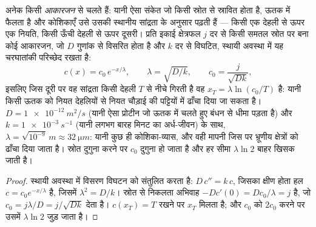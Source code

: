 \begin{theorem}\label{thm:b2:vertebrate-development:gradient}
अनेक  किसी \emph{आकारजन} से चलते हैं: यानी ऐसा संकेत जो किसी
स्रोत से स्रावित होता है, ऊतक में फैलता है और कोशिकाएँ उसे उसकी स्थानीय
सांद्रता के अनुसार पढ़ती हैं --- किसी एक देहली से ऊपर एक नियति, किसी
ऊँची देहली से ऊपर दूसरी। प्रति इकाई क्षेत्रफल $j$ दर से किसी समतल स्रोत
पर बना कोई आकारजन, जो $D$ गुणांक से विसरित होता है और $k$ दर से विघटित,
स्थायी अवस्था में यह चरघातांकी परिच्छेद रखता है:
\[
c(x) = c_0\,e^{-x/\lambda}, \qquad \lambda = \sqrt{D/k}, \qquad c_0 = \frac{j}{\sqrt{Dk}},
\]
इसलिए जिस दूरी पर वह सांद्रता किसी देहली $T$ से नीचे गिरती है वह
$x_T = \lambda\ln(c_0/T)$ है: यानी किसी ऊतक को नियत देहलियों से नियत
चौड़ाई की पट्टियों में ढाँचा दिया जा सकता है। $D =
\qty{1e-12}{m^2/s}$ (यानी ऐसा प्रोटीन जो ऊतक में चलते हुए बंधन से धीमा
पड़ता है) और $k = \qty{1e-3}{s^{-1}}$ (यानी लगभग बारह मिनट का अर्ध-जीवन)
के साथ, $\lambda = \sqrt{10^{-9}}\,\unit{m} \approx
\qty{32}{\micro m}$: यानी कुछ ही कोशिका-व्यास, और वही मापनी जिस पर
भ्रूणीय क्षेत्रों को ढाँचा दिया जाता है। स्रोत दुगुना करने पर $c_0$
दुगुना हो जाता है और हर सीमा $\lambda
\ln 2$ बाहर खिसक जाती है।
\end{theorem}
\begin{proof}
स्थायी अवस्था में विसरण विघटन को संतुलित करता है: $D\,c'' = k\,c$,
जिसका क्षीण होता हल $c = c_0 e^{-x/\lambda}$ है, जिसमें $\lambda^2 =
D/k$। स्रोत से निकलता अभिवाह $-Dc'(0) = Dc_0/\lambda = j$ है,
जो $c_0 = j\lambda/D = j/\sqrt{Dk}$ देता है। $c(x_T) = T$ रखने पर
$x_T$ मिलता है; और $c_0$ को $2c_0$ करने पर उसमें $\lambda\ln 2$ जुड़ जाता है।
\end{proof}

